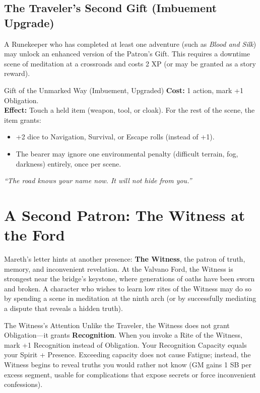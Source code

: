 \documentclass[10pt,twoside]{book}
\begin{document}
\subsection*{The Traveler's Second Gift (Imbuement Upgrade)}

A Runekeeper who has completed at least one adventure (such as \textit{Blood and Silk}) may unlock an enhanced version of the Patron's Gift. This requires a downtime scene of meditation at a crossroads and costs 2 XP (or may be granted as a story reward).

\begin{adventurebox}{Gift of the Unmarked Way (Imbuement, Upgraded)}
\textbf{Cost:} 1 action, mark +1 Obligation. \\
\textbf{Effect:} Touch a held item (weapon, tool, or cloak). For the rest of the scene, the item grants:
\begin{itemize}
\item +2 dice to Navigation, Survival, or Escape rolls (instead of +1).
\item The bearer may ignore one environmental penalty (difficult terrain, fog, darkness) entirely, once per scene.
\end{itemize}
\textit{``The road knows your name now. It will not hide from you.''}
\end{adventurebox}

\section*{A Second Patron: The Witness at the Ford}

Mareth's letter hints at another presence: \textbf{The Witness}, the patron of truth, memory, and inconvenient revelation. At the Valvano Ford, the Witness is strongest near the bridge's keystone, where generations of oaths have been sworn and broken. A character who wishes to learn low rites of the Witness may do so by spending a scene in meditation at the ninth arch (or by successfully mediating a dispute that reveals a hidden truth).

\begin{cursebox}{The Witness's Attention}
Unlike the Traveler, the Witness does not grant Obligation---it grants \textbf{Recognition}. When you invoke a Rite of the Witness, mark +1 Recognition instead of Obligation. Your Recognition Capacity equals your Spirit + Presence. Exceeding capacity does not cause Fatigue; instead, the Witness begins to reveal truths you would rather not know (GM gains 1 SB per excess segment, usable for complications that expose secrets or force inconvenient confessions).
\end{cursebox}
\end{document}

